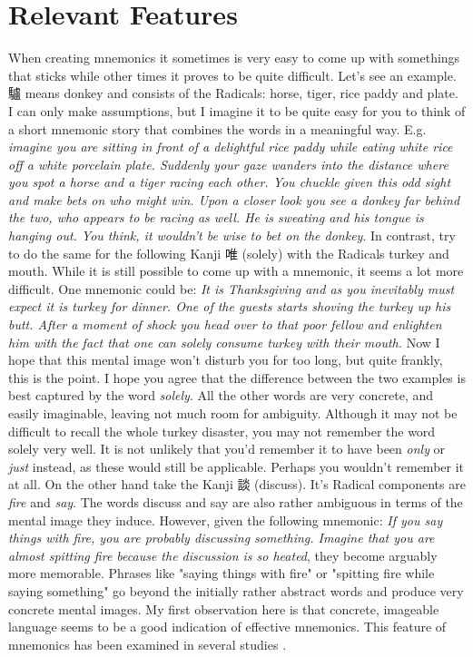 \section{Relevant Features} \label{sec:body_relevant_features}
When creating mnemonics it sometimes is very easy to come up with somethings that sticks while other times it proves to be quite difficult. Let's see an example. 驢 means donkey and consists of the Radicals: horse, tiger, rice paddy and plate. I can only make assumptions, but I imagine it to be quite easy for you to think of a short mnemonic story that combines the words in a meaningful way. E.g. \emph{imagine you are sitting in front of a delightful rice paddy while eating white rice off a white porcelain plate. Suddenly your gaze wanders into the distance where you spot a horse and a tiger racing each other. You chuckle given this odd sight and make bets on who might win. Upon a closer look you see a donkey far behind the two, who appears to be racing as well. He is sweating and his tongue is hanging out. You think, it wouldn't be wise to bet on the donkey}. In contrast, try to do the same for the following Kanji 唯 (solely) with the Radicals turkey and mouth. While it is still possible to come up with a mnemonic, it seems a lot more difficult. One mnemonic could be: \emph{It is Thanksgiving and as you inevitably must expect it is turkey for dinner. One of the guests starts shoving the turkey up his butt.  After a moment of shock you head over to that poor fellow and  enlighten him with the fact that one can solely consume turkey with their mouth.} Now I hope that this mental image won't disturb you for too long, but quite frankly, this is the point. I hope you agree that the difference between the two examples is best captured by the word \emph{solely}. All the other words are very concrete, and easily imaginable, leaving not much room for ambiguity. Although it may not be difficult to recall the whole turkey disaster, you may not remember the word solely very well. It is not unlikely that you'd remember it to have been \emph{only} or \emph{just} instead, as these would still be applicable. Perhaps you wouldn't remember it at all. On the other hand take the Kanji 談 (discuss). It's Radical components are \emph{fire} and \emph{say}. The words discuss and say are also rather ambiguous in terms of the mental image they induce. However, given the following mnemonic: \emph{If you say things with fire, you are probably discussing something. Imagine that you are almost spitting fire because the discussion is so heated}, they become arguably more memorable. Phrases like "saying things with fire" or "spitting fire while saying something" go beyond the initially rather abstract words and produce very concrete mental images. My first observation here is that concrete, imageable language seems to be a good indication of effective mnemonics. This feature of mnemonics has been examined in  several studies \cite{campos_2004} \cite{campos_2011} \cite{kordjazi2014effect}.

